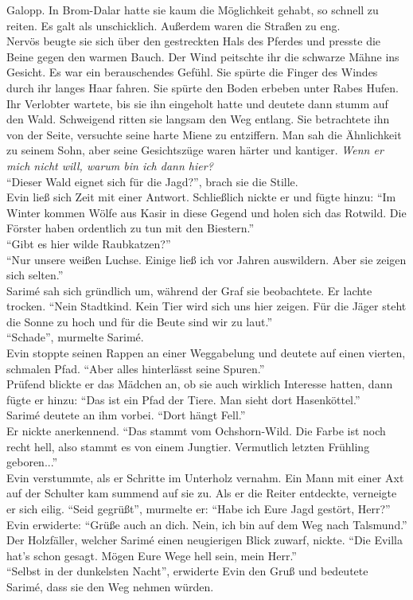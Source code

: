 Galopp. In Brom-Dalar hatte sie kaum die Möglichkeit gehabt, so schnell zu reiten. Es galt als 
unschicklich. Außerdem waren die Straßen zu eng.\\
Nervös beugte sie sich über den gestreckten Hals des Pferdes und presste die Beine gegen den warmen 
Bauch. Der Wind peitschte ihr die schwarze Mähne ins Gesicht. Es war ein berauschendes Gefühl. Sie 
spürte die Finger des Windes durch ihr langes Haar fahren. Sie spürte den Boden erbeben unter Rabes 
Hufen.\\
Ihr Verlobter wartete, bis sie ihn eingeholt hatte und deutete dann stumm auf den Wald. 
Schweigend ritten sie langsam den Weg entlang. Sie betrachtete ihn von der Seite, versuchte seine 
harte Miene zu entziffern. Man sah die Ähnlichkeit zu seinem Sohn, aber seine Gesichtszüge 
waren härter und kantiger. \textit{Wenn er mich nicht will, warum bin ich dann hier?}\\
``Dieser Wald eignet sich für die Jagd?'', brach sie die Stille.\\
Evin ließ sich Zeit mit einer Antwort. Schließlich nickte er und fügte hinzu: ``Im Winter kommen 
Wölfe aus Kasir in diese Gegend und holen sich das Rotwild. Die Förster haben ordentlich zu tun mit 
den Biestern.''\\
``Gibt es hier wilde Raubkatzen?''\\
``Nur unsere weißen Luchse. Einige ließ ich vor Jahren auswildern. Aber sie zeigen sich selten.''\\
Sarimé sah sich gründlich um, während der Graf sie beobachtete. Er lachte trocken. ``Nein 
Stadtkind. Kein Tier wird sich uns hier zeigen. Für die Jäger steht die Sonne zu hoch und für die 
Beute sind wir zu laut.''\\
``Schade'', murmelte Sarimé.\\
Evin stoppte seinen Rappen an einer Weggabelung und deutete auf einen vierten, schmalen Pfad. 
``Aber alles hinterlässt seine Spuren.''\\
Prüfend blickte er das Mädchen an, ob sie auch wirklich Interesse hatten, dann fügte er hinzu: 
``Das ist ein Pfad der Tiere. Man sieht dort Hasenköttel.''\\
Sarimé deutete an ihm vorbei. ``Dort hängt Fell.''\\
Er nickte anerkennend. ``Das stammt vom Ochshorn-Wild. Die Farbe ist noch recht hell, also stammt 
es von einem Jungtier. Vermutlich letzten Frühling geboren...''\\
Evin verstummte, als er Schritte im Unterholz vernahm. Ein Mann mit einer Axt auf der Schulter kam 
summend auf sie zu. Als er die Reiter entdeckte, verneigte er sich eilig. ``Seid gegrüßt'', 
murmelte er: ``Habe ich Eure Jagd gestört, Herr?''\\
Evin erwiderte: ``Grüße auch an dich. Nein, ich bin auf dem Weg nach Talsmund.''\\
Der Holzfäller, welcher Sarimé einen neugierigen Blick zuwarf, nickte. ``Die Evilla hat's schon 
gesagt. Mögen Eure Wege hell sein, mein Herr.''\\
``Selbst in der dunkelsten Nacht'', erwiderte Evin den Gruß und bedeutete Sarimé, dass sie den 
Weg nehmen würden.\\

